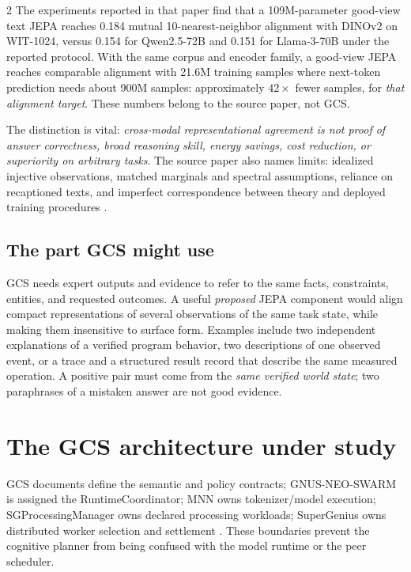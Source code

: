 \documentclass[10pt,letterpaper]{article}
\begin{document}
\begin{multicols}{2}
The experiments reported in that paper find that a 109M-parameter good-view text JEPA reaches 0.184 mutual 10-nearest-neighbor alignment with DINOv2 on WIT-1024, versus 0.154 for Qwen2.5-72B and 0.151 for Llama-3-70B under the reported protocol. With the same corpus and encoder family, a good-view JEPA reaches comparable alignment with 21.6M training samples where next-token prediction needs about 900M samples: approximately $42\times$ fewer samples, for \emph{that alignment target}. These numbers belong to the source paper, not GCS.

The distinction is vital: \emph{cross-modal representational agreement is not proof of answer correctness, broad reasoning skill, energy savings, cost reduction, or superiority on arbitrary tasks}. The source paper also names limits: idealized injective observations, matched marginals and spectral assumptions, reliance on recaptioned texts, and imperfect correspondence between theory and deployed training procedures \cite{balestriero2026}.

\subsection{The part GCS might use}
GCS needs expert outputs and evidence to refer to the same facts, constraints, entities, and requested outcomes. A useful \emph{proposed} JEPA component would align compact representations of several observations of the same task state, while making them insensitive to surface form. Examples include two independent explanations of a verified program behavior, two descriptions of one observed event, or a trace and a structured result record that describe the same measured operation. A positive pair must come from the \emph{same verified world state}; two paraphrases of a mistaken answer are not good evidence.

\section{The GCS architecture under study}
GCS documents define the semantic and policy contracts; GNUS-NEO-SWARM is assigned the RuntimeCoordinator; MNN owns tokenizer/model execution; SGProcessingManager owns declared processing workloads; SuperGenius owns distributed worker selection and settlement \cite{gcsadr}. These boundaries prevent the cognitive planner from being confused with the model runtime or the peer scheduler.


\end{multicols}
\end{document}
